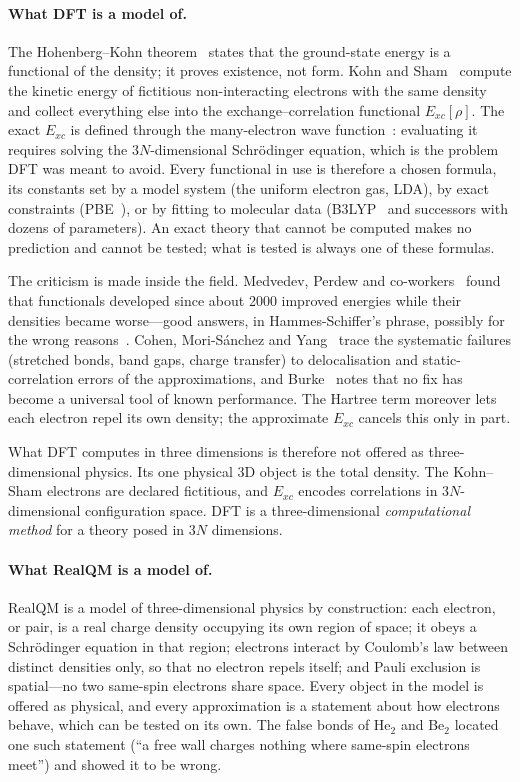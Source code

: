 \documentclass[11pt]{article}
\begin{document}
\paragraph{What DFT is a model of.}
The Hohenberg--Kohn theorem~\cite{hk} states that the ground-state energy is a functional of the
density; it proves existence, not form. Kohn and Sham~\cite{ks} compute the kinetic energy of fictitious
non-interacting electrons with the same density and collect everything else into the
exchange--correlation functional $E_{xc}[\rho]$. The exact $E_{xc}$ is defined through the many-electron
wave function~\cite{levy}: evaluating it requires solving the $3N$-dimensional Schr\"odinger equation,
which is the problem DFT was meant to avoid. Every functional in use is therefore a chosen formula, its
constants set by a model system (the uniform electron gas, LDA), by exact constraints (PBE~\cite{pbe}),
or by fitting to molecular data (B3LYP~\cite{b3lyp} and successors with dozens of parameters). An exact
theory that cannot be computed makes no prediction and cannot be tested; what is tested is always one
of these formulas.

The criticism is made inside the field. Medvedev, Perdew and co-workers~\cite{medvedev} found that
functionals developed since about 2000 improved energies while their densities became worse---good
answers, in Hammes-Schiffer's phrase, possibly for the wrong reasons~\cite{hammes}. Cohen, Mori-S\'anchez
and Yang~\cite{cohen} trace the systematic failures (stretched bonds, band gaps, charge transfer) to
delocalisation and static-correlation errors of the approximations, and Burke~\cite{burke} notes that
no fix has become a universal tool of known performance. The Hartree term moreover lets each electron
repel its own density; the approximate $E_{xc}$ cancels this only in part.

What DFT computes in three dimensions is therefore not offered as three-dimensional physics. Its one
physical 3D object is the total density. The Kohn--Sham electrons are declared fictitious, and $E_{xc}$
encodes correlations in $3N$-dimensional configuration space. DFT is a three-dimensional
\emph{computational method} for a theory posed in $3N$ dimensions.

\paragraph{What RealQM is a model of.}
RealQM is a model of three-dimensional physics by construction: each electron, or pair, is a real
charge density occupying its own region of space; it obeys a Schr\"odinger equation in that region;
electrons interact by Coulomb's law between distinct densities only, so that no electron repels
itself; and Pauli exclusion is spatial---no two same-spin electrons share space. Every object in the
model is offered as physical, and every approximation is a statement about how electrons behave, which
can be tested on its own. The false bonds of He$_2$ and Be$_2$ located one such statement (``a free wall
charges nothing where same-spin electrons meet'') and showed it to be wrong.
\end{document}
